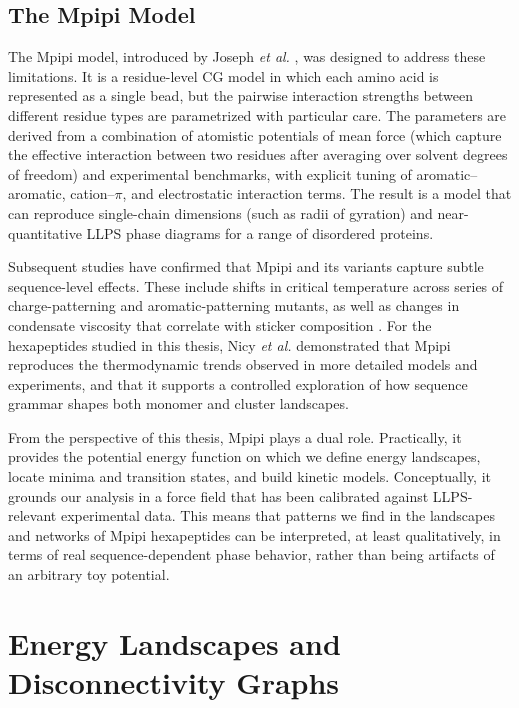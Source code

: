 \subsection{The Mpipi Model}

The Mpipi model, introduced by Joseph \emph{et al.} \cite{Joseph2021Mpipi},
was designed to address these limitations. It is a residue-level CG model in
which each amino acid is represented as a single bead, but the pairwise
interaction strengths between different residue types are parametrized with
particular care. The parameters are derived from a combination of atomistic
potentials of mean force (which capture the effective interaction between two
residues after averaging over solvent degrees of freedom) and experimental
benchmarks, with explicit tuning of aromatic--aromatic, cation--$\pi$, and
electrostatic interaction terms. The result is a model that can reproduce
single-chain dimensions (such as radii of gyration) and near-quantitative LLPS
phase diagrams for a range of disordered proteins.

Subsequent studies have confirmed that Mpipi and its variants capture subtle
sequence-level effects. These include shifts in critical temperature across
series of charge-patterning and aromatic-patterning mutants, as well as changes
in condensate viscosity that correlate with sticker composition
\cite{Nicy2024Mpipi,Cao2024CALVADOS}. For the hexapeptides studied in this
thesis, Nicy \emph{et al.} \cite{Nicy2024Mpipi} demonstrated that Mpipi
reproduces the thermodynamic trends observed in more detailed models and
experiments, and that it supports a controlled exploration of how sequence
grammar shapes both monomer and cluster landscapes.

From the perspective of this thesis, Mpipi plays a dual role. Practically, it
provides the potential energy function on which we define energy landscapes,
locate minima and transition states, and build kinetic models. Conceptually, it
grounds our analysis in a force field that has been calibrated against
LLPS-relevant experimental data. This means that patterns we find in the
landscapes and networks of Mpipi hexapeptides can be interpreted, at least
qualitatively, in terms of real sequence-dependent phase behavior, rather than
being artifacts of an arbitrary toy potential.


\section{Energy Landscapes and Disconnectivity Graphs}\label{sec:landscape-theory}

